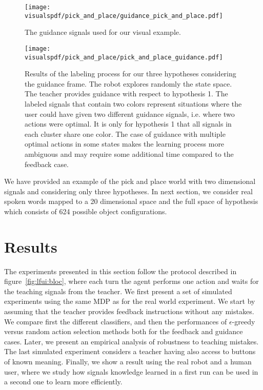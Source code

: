 \begin{figure}[H]
  \centering
  \texttt{[image: \\visualspdf/pick\_and\_place/guidance\_pick\_and\_place.pdf]}
  \caption{The guidance signals used for our visual example.}
  \label{fig:lfui:pickplaceguidancesignals}
\end{figure}

\begin{figure}[H]
  \centering
  \texttt{[image: \\visualspdf/pick\_and\_place/pick\_and\_place\_guidance.pdf]}
  \caption{Results of the labeling process for our three hypotheses considering the guidance frame. The robot explores randomly the state space. The teacher provides guidance with respect to hypothesis 1. The labeled signals that contain two colors represent situations where the user could have given two different guidance signals, i.e. where two actions were optimal. It is only for hypothesis 1 that all signals in each cluster share one color. The case of guidance with multiple optimal actions in some states makes the learning process more ambiguous and may require some additional time compared to the feedback case.}
  \label{fig:lfui:pickplaceguidance}
\end{figure}

\newpage


We have provided an example of the pick and place world with two dimensional signals and considering only three hypotheses. In next section, we consider real spoken words mapped to a 20 dimensional space and the full space of hypothesis which consists of 624 possible object configurations.

\section{Results}
\label{chapter:lfui:results}

The experiments presented in this section follow the protocol described in figure~\ref{fig:lfui:bloc}, where each turn the agent performs one action and waits for the teaching signals from the teacher. We first present a set of simulated experiments using the same MDP as for the real world experiment. We start by assuming that the teacher provides feedback instructions without any mistakes. %
We compare first the different classifiers, and then the performances of $\epsilon$-greedy versus random action selection methods both for the feedback and guidance cases. Later, we present an empirical analysis of robustness to teaching mistakes. The last simulated experiment considers a teacher having also access to buttons of known meaning. Finally, we show a result using the real robot and a human user, where we study how signals knowledge learned in a first run can be used in a second one to learn more efficiently.

